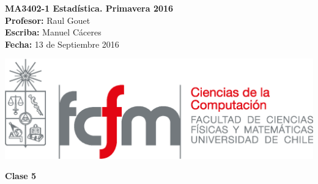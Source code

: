 \documentclass[10pt]{article}
\theoremstyle{plain}
\theoremstyle{definition}
\newcommand{\catnum}{5} %
\newcommand{\fecha}{13 de Septiembre 2016 }
\begin{document}
\vspace*{-1.2 cm}
\begin{minipage}{0.6\textwidth}
\begin{flushleft}
\hspace*{-0.5cm}\textbf{MA3402-1 Estadística. Primavera 2016}\\
\hspace*{-0.5cm}\textbf{Profesor:} Raul Gouet\\
\hspace*{-0.5cm}\textbf{Escriba:} Manuel Cáceres\\
\hspace*{-0.5cm}\textbf{Fecha:} \fecha
\end{flushleft}
\end{minipage}
\begin{minipage}{0.36\textwidth}
\begin{flushright}
\includegraphics[scale=0.3]{imagenes/fcfm_dcc}
\end{flushright}
\end{minipage}
\bigskip

\begin{center}
\LARGE\textbf{Clase \catnum}
\end{center}
\end{document}
